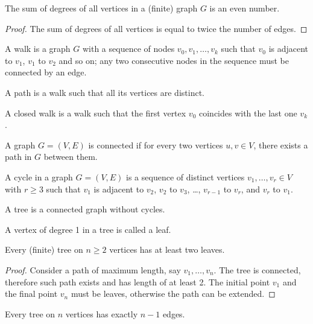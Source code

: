 \begin{lemma}
The sum of degrees of all vertices in a (finite) graph $G$ is an even number.
\end{lemma}
\begin{proof}
The sum of degrees of all vertices is equal to twice the number of edges.
\end{proof}
\begin{definition}
A walk is a graph $G$ with a sequence of nodes $v_{0},v_{1},\dots,v_{k}$ such that $v_{0}$ is adjacent to $v_{1}$, $v_{1}$ to $v_{2}$ and so on; any two consecutive nodes in the sequence must be connected by an edge.
\end{definition}
\begin{definition}
A path is a walk such that all its vertices are distinct.
\end{definition}
\begin{definition}
A closed walk is a walk such that the first vertex $v_{0}$ coincides with the last one $v_{k}$.
\end{definition}
\begin{definition}
	A graph $G=(V,E)$ is connected if for every two vertices $u,v\in V$, there exists a path in $G$ between them.
\end{definition}
\begin{definition}
A cycle in a graph $G=(V,E)$ is a sequence of distinct vertices $v_{1},\dots,v_{r}\in V$ with $r\ge 3$ such that $v_{1}$ is adjacent to $v_{2}$, $v_{2}$ to $v_{3}$, \dots, $v_{r - 1}$ to $v_{r}$, and $v_{r}$ to $v_{1}$.
\end{definition}
\begin{definition}
A tree is a connected graph without cycles.
\end{definition}
\begin{definition}
A vertex of degree 1 in a tree is called a leaf.
\end{definition}
\begin{lemma}
Every (finite) tree on $n\ge 2$ vertices has at least two leaves.
\end{lemma}
\begin{proof}
Consider a path of maximum length, say $v_{1},\dots,v_{n}$. The tree is connected, therefore such path exists and has length of at least 2. The initial point $v_{1}$ and the final point $v_{n}$ must be leaves, otherwise the path can be extended.
\end{proof}
\begin{lemma}
Every tree on $n$ vertices has exactly $n-1$ edges.
\end{lemma}
